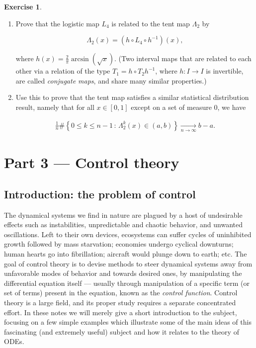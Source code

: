 \documentclass[11pt]{report}
\theoremstyle{plain}
\theoremstyle{definition}
\newtheorem{xexercise}[thm]{Exercise}
\begin{document}
\begin{xexercise}

\begin{enumerate}[label=\arabic*.]
\item Prove that the logistic map $L_4$ is related to the
tent map $\Lambda_2$ by

\[
\Lambda_2(x) = (h\circ L_4 \circ h^{-1})(x),
\]

\noindent where $h(x) = \frac{2}{\pi}\arcsin(\sqrt{x})$. (Two
interval maps that are related to each other via a
relation of the type $T_1=h\circ T_2 h^{-1}$, where
$h:I\to I$ is invertible, are called \emph{conjugate maps},
and share many similar properties.)

\item Use this to prove that the tent map satisfies a
similar statistical distribution result, namely that
for all $x\in[0,1]$ except on a set of measure 0, we
have

\begin{align*}
\frac{1}{n}\#\left\{ 0\le k\le n-1\,:\, \Lambda_2^k(x) \in (a,b) \right\} \xrightarrow[n\to\infty]{} b-a.
\end{align*}
\end{enumerate}

\end{xexercise}

\chapter{Part 3 — Control theory}

\section{Introduction: the problem of control}

The dynamical systems we find in nature are plagued by
a host of undesirable effects such as instabilities,
unpredictable and chaotic behavior, and unwanted
oscillations. Left to their own devices, ecosystems
can suffer cycles of uninhibited growth followed by
mass starvation; economies undergo cyclical downturns;
human hearts go into fibrillation; aircraft would
plunge down to earth; etc. The goal of control theory
is to devise methods to steer dynamical systems away
from unfavorable modes of behavior and towards desired
ones, by manipulating the differential equation itself
--- usually through manipulation of a specific term
(or set of terms) present in the equation, known as
the \emph{control function}. Control theory is a large
field, and its proper study requires a separate
concentrated effort. In these notes we will merely
give a short introduction to the subject, focusing on
a few simple examples which illustrate some of the
main ideas of this fascinating (and extremely useful)
subject and how it relates to the theory of ODEs.
\end{document}
